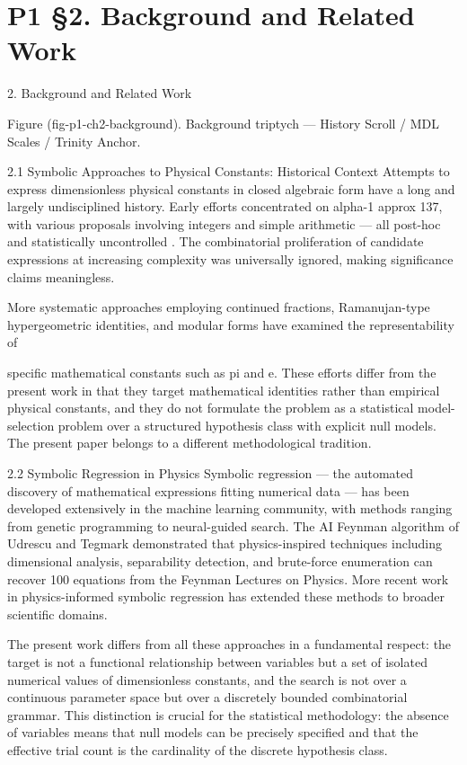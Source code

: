 
\section{P1 §2. Background and Related Work}

2. Background and Related Work

       Figure (fig-p1-ch2-background). Background triptych --- History Scroll / MDL Scales / Trinity
                                               Anchor.

  2.1 Symbolic Approaches to Physical Constants: Historical Context
  Attempts to express dimensionless physical constants in closed algebraic form have a
  long and largely undisciplined history. Early efforts concentrated on alpha-1 approx
  137, with various proposals involving integers and simple arithmetic --- all post-hoc and
  statistically uncontrolled \citep{pdg2024}. The combinatorial proliferation of
  candidate expressions at increasing complexity was universally ignored, making
  significance claims meaningless.

  More systematic approaches employing continued fractions, Ramanujan-type
  hypergeometric identities, and modular forms have examined the representability of

  specific mathematical constants such as pi and e. These efforts differ from the present
  work in that they target mathematical identities rather than empirical physical
  constants, and they do not formulate the problem as a statistical model-selection
  problem over a structured hypothesis class with explicit null models. The present paper
  belongs to a different methodological tradition.

  2.2 Symbolic Regression in Physics
  Symbolic regression --- the automated discovery of mathematical expressions fitting
  numerical data --- has been developed extensively in the machine learning community,
  with methods ranging from genetic programming to neural-guided search. The AI
  Feynman algorithm of Udrescu and Tegmark \citep{udrescu2020} demonstrated
  that physics-inspired techniques including dimensional analysis, separability detection,
  and brute-force enumeration can recover 100 equations from the Feynman Lectures on
  Physics. More recent work in physics-informed symbolic regression \citep{angelis2023} has extended these methods
  to broader scientific domains.

  The present work differs from all these approaches in a fundamental respect: the target
  is not a functional relationship between variables but a set of isolated numerical values
  of dimensionless constants, and the search is not over a continuous parameter space
  but over a discretely bounded combinatorial grammar. This distinction is crucial for the
  statistical methodology: the absence of variables means that null models can be
  precisely specified and that the effective trial count is the cardinality of the discrete
  hypothesis class.

